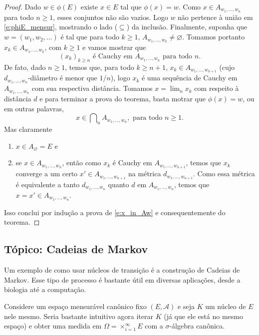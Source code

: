 \documentclass[reqno, final]{book}
\newcommand*\1{\mathds{1}}
\DeclareMathOperator*{\mcap}{{\textstyle \bigcap}}
\begin{document}
\begin{proof}
  Dado $w \in \phi(E)$ existe $x \in E$ tal que $\phi(x) = w$.
  Como $x \in A_{w_1, \dots, w_n}$ para todo $n \geq 1$, esses conjuntos não são vazios.
  Logo $w$ não pertence à união em \eqref{e:phiE_mensur}, mostrando o lado ($\subseteq$) da inclusão.
  Finalmente, suponha que $w = (w_1, w_2, \dots)$ é tal que para todo $k \geq 1$, $A_{w_1, \dots, w_k} \neq \varnothing$.
  Tomamos portanto $x_k \in A_{w_1, \dots, w_k}$, com $k \geq 1$ e vamos mostrar que
  \begin{equation}
    \text{$(x_k)_{k \geq n}$ é Cauchy em $A_{w_1, \dots, w_n}$ para todo $n$.}
  \end{equation}
  De fato, dado $n \geq 1$, temos que, para todo $k \geq n + 1$, $x_k \in A_{w_1, \dots, w_{n+1}}$ (cujo $d_{w_1, \dots, w_{n}}$-diâmetro é menor que $1/n$), logo $x_k$ é uma sequência de Cauchy em $A_{w_1, \dots, w_n}$ com sua respectiva distância.
  Tomamos $x = \lim_n x_k$ com respeito à distância $d$ e para terminar a prova do teorema, basta motrar que $\phi(x) = w$, ou em outras palavras,
  \begin{equation}
    \label{e:x_in_Aw}
    x \in \mcap_n A_{w_1, \dots, w_n}, \text{ para todo $n \geq 1$.}
  \end{equation}
  Mas claramente
  \begin{enumerate}[\quad a)]
  \item $x \in A_\varnothing = E$ e
  \item se $x \in A_{w_1, \dots, w_n}$, então como $x_k$ é Cauchy em $A_{w_1, \dots, w_{n+1}}$, temos que $x_k$ converge a um certo $x' \in A_{w_1, \dots, w_{n+1}}$ na métrica $d_{w_1, \dots, w_{n+1}}$.
    Como essa métrica é equivalente a tanto $d_{w_1, \dots, w_n}$ quanto $d$ em $A_{w_1, \dots, w_n}$, temos que $x = x' \in A_{w_1, \dots, w_n}$.
  \end{enumerate}
  Isso conclui por indução a prova de \eqref{e:x_in_Aw} e consequentemente do teorema.
\end{proof}

\subsection{Tópico: Cadeias de Markov}

Um exemplo de como usar núcleos de transição é a construção de Cadeias de Markov.
Esse tipo de processo é bastante útil em diversas aplicações, desde a biologia até a computação.

Considere um espaço mensurável canônico fixo $(E, \mathcal{A})$ e seja $K$ um núcleo de $E$ nele mesmo.
Seria bastante intuitivo agora iterar $K$ (já que ele está no mesmo espaço) e obter uma medida em $\Omega = \times_{i=1}^\infty E$ com a $\sigma$-álgebra canônica.
\end{document}
